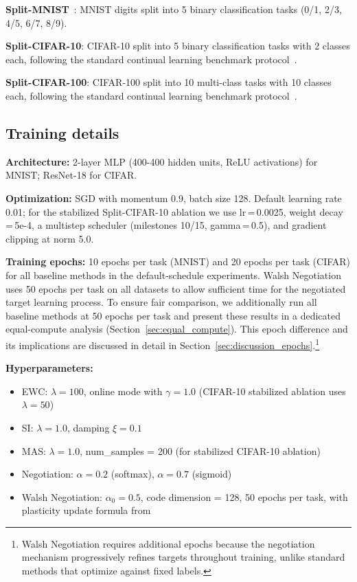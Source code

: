 \documentclass[preprint,review,12pt]{elsarticle}
\begin{document}
\textbf{Split-MNIST}~\cite{zenke2017continual}: MNIST digits split into 5 binary classification tasks (0/1, 2/3, 4/5, 6/7, 8/9).

\textbf{Split-CIFAR-10}: CIFAR-10 split into 5 binary classification tasks with 2 classes each, following the standard continual learning benchmark protocol~\cite{van2019three}.

\textbf{Split-CIFAR-100}: CIFAR-100 split into 10 multi-class tasks with 10 classes each, following the standard continual learning benchmark protocol~\cite{van2019three}.

\subsection{Training details}

\textbf{Architecture:} 2-layer MLP (400-400 hidden units, ReLU activations) for MNIST; ResNet-18 for CIFAR.

\textbf{Optimization:} SGD with momentum 0.9, batch size 128. Default learning rate 0.01; for the stabilized Split-CIFAR-10 ablation we use lr\,=\,0.0025, weight decay\,=\,5e-4, a multistep scheduler (milestones 10/15, gamma\,=\,0.5), and gradient clipping at norm 5.0.

\textbf{Training epochs:} 10 epochs per task (MNIST) and 20 epochs per task (CIFAR) for all baseline methods in the default-schedule experiments. Walsh Negotiation uses 50 epochs per task on all datasets to allow sufficient time for the negotiated target learning process. To ensure fair comparison, we additionally run all baseline methods at 50 epochs per task and present these results in a dedicated equal-compute analysis (Section~\ref{sec:equal_compute}). This epoch difference and its implications are discussed in detail in Section~\ref{sec:discussion_epochs}.\footnote{Walsh Negotiation requires additional epochs because the negotiation mechanism progressively refines targets throughout training, unlike standard methods that optimize against fixed labels.}

\textbf{Hyperparameters:}
\begin{itemize}
\item EWC: $\lambda = 100$, online mode with $\gamma = 1.0$ (CIFAR-10 stabilized ablation uses $\lambda = 50$)
\item SI: $\lambda = 1.0$, damping $\xi = 0.1$
\item MAS: $\lambda = 1.0$, num\_samples = 200 (for stabilized CIFAR-10 ablation)
\item Negotiation: $\alpha = 0.2$ (softmax), $\alpha = 0.7$ (sigmoid)
\item Walsh Negotiation: $\alpha_0 = 0.5$, code dimension = 128, 50 epochs per task, with plasticity update formula from~\cite{korhan2023negotiated}
\end{itemize}
\end{document}
